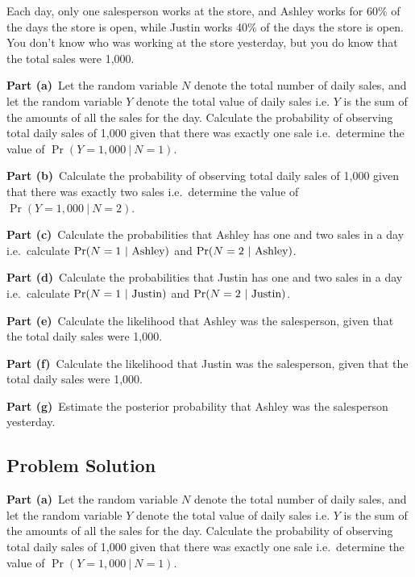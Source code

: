 \documentclass[12pt]{article}
\theoremstyle{definition}
\begin{document}
\bigskip
Each day, only one salesperson works at the store, and Ashley works for 60\% of the days the store is open, while Justin works 40\% of the days the store is open. You don't know who was working at the store yesterday, but you do know that the total sales were 1,000. 

\bigskip
\noindent
{\bf Part (a)}\ Let the random variable $N$ denote the total number of daily sales, and let the random variable $Y$ denote the total value of daily sales i.e. $Y$ is the sum of the amounts of all the sales for the day. Calculate the probability of observing total daily sales of 1,000 given that there was exactly one sale i.e.\ determine the value of $\Pr(Y = 1,000\ |\ N = 1)$.

\bigskip
\noindent
{\bf Part (b)}\ Calculate the probability of observing total daily sales of 1,000 given that there was exactly two sales i.e.\ determine the value of $\Pr(Y = 1,000\ |\ N = 2)$.

\bigskip
\noindent
{\bf Part (c)}\ Calculate the probabilities that Ashley has one and two sales in a day i.e.\ calculate $\Pr(N = 1\ |\ \hbox{Ashley})$ and $\Pr(N = 2\ |\ \hbox{Ashley})$.


\bigskip
\noindent
{\bf Part (d)}\ Calculate the probabilities that Justin has one and two sales in a day i.e.\ calculate $\Pr(N = 1\ |\ \hbox{Justin})$ and $\Pr(N = 2\ |\ \hbox{Justin})$.

\bigskip
\noindent
{\bf Part (e)}\ Calculate the likelihood that Ashley was the salesperson, given that the total daily sales were 1,000.


\bigskip
\noindent
{\bf Part (f)}\ Calculate the likelihood that Justin was the salesperson, given that the total daily sales were 1,000.



\bigskip
\noindent
{\bf Part (g)}\ Estimate the posterior probability that Ashley was the salesperson yesterday.


\subsection*{Problem Solution}

\bigskip
\noindent
{\bf Part (a)}\ Let the random variable $N$ denote the total number of daily sales, and let the random variable $Y$ denote the total value of daily sales i.e. $Y$ is the sum of the amounts of all the sales for the day. Calculate the probability of observing total daily sales of 1,000 given that there was exactly one sale i.e.\ determine the value of $\Pr(Y = 1,000\ |\ N = 1)$.
\end{document}
